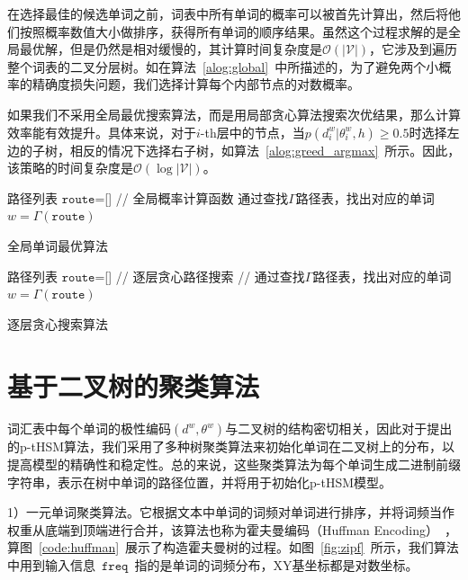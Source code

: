 在选择最佳的候选单词之前，词表中所有单词的概率可以被首先计算出，然后将他们按照概率数值大小做排序，获得所有单词的顺序结果。虽然这个过程求解的是全局最优解，但是仍然是相对缓慢的，其计算时间复杂度是$\mathcal{O}(\mathcal{|V|})$，它涉及到遍历整个词表的二叉分层树。如在算法~\ref{alog:global}~中所描述的，为了避免两个小概率的精确度损失问题，我们选择计算每个内部节点的对数概率。


如果我们不采用全局最优搜索算法，而是用局部贪心算法搜索次优结果，那么计算效率能有效提升。具体来说，对于$i$-th层中的节点，当$ p(d^w_i | \theta_{i}^ w,h)\ge 0.5 $时选择左边的子树，相反的情况下选择右子树，如算法~\ref{alog:greed_argmax}~所示。因此，该策略的时间复杂度是$\mathcal{O}(\log\mathcal{|V|})$。

\begin{algorithm}[!ht]
\SetAlgoLined
{}
 路径列表 $\mathtt{route}$=[] \;
{// 全局概率计算函数}\;
{通过查找$\Gamma$路径表，找出对应的单词}\;
$w=\Gamma(\mathtt{route})$\;
\caption{全局单词最优算法}\label{alog:global}
\end{algorithm}

\begin{algorithm}[!ht]
\SetAlgoLined
{}
 路径列表 $\mathtt{route}$=[] \;
 {// 逐层贪心路径搜索}\;
{// 通过查找$\Gamma$路径表，找出对应的单词}\;
$w=\Gamma(\mathtt{route})$\;
\caption{逐层贪心搜索算法\label{alog:greed_argmax}}
\setlength{\abovedisplayskip}{6pt}
\setlength{\belowdisplayskip}{6pt}
\end{algorithm}



\section{基于二叉树的聚类算法}
词汇表中每个单词的极性编码$(d^w,\theta^w)$与二叉树的结构密切相关，因此对于提出的p-tHSM算法，我们采用了多种树聚类算法来初始化单词在二叉树上的分布，以提高模型的精确性和稳定性。总的来说，这些聚类算法为每个单词生成二进制前缀字符串，表示在树中单词的路径位置，并将用于初始化p-tHSM模型。


1）一元单词聚类算法。它根据文本中单词的词频对单词进行排序，并将词频当作权重从底端到顶端进行合并，该算法也称为霍夫曼编码（Huffman Encoding）~，算图~\ref{code:huffman}~展示了构造霍夫曼树的过程。如图~\ref{fig:zipf}~所示，我们算法中用到输入信息~$\texttt{freq}$~指的是单词的词频分布，XY基坐标都是对数坐标。



